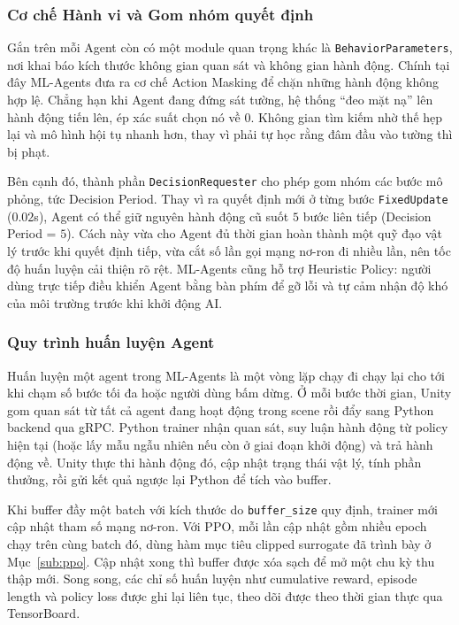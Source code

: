 \subsubsection{Cơ chế Hành vi và Gom nhóm quyết định}
\indent Gắn trên mỗi Agent còn có một module quan trọng khác là \texttt{BehaviorParameters},
nơi khai báo kích thước không gian quan sát và không gian hành động. Chính tại đây
ML-Agents đưa ra cơ chế Action Masking để chặn những hành động không
hợp lệ. Chẳng hạn khi Agent đang đứng sát tường, hệ thống ``đeo mặt nạ'' lên hành động tiến
lên, ép xác suất chọn nó về $0$. Không gian tìm kiếm nhờ thế hẹp lại và mô hình hội tụ nhanh
hơn, thay vì phải tự học rằng đâm đầu vào tường thì bị phạt.

\indent Bên cạnh đó, thành phần \texttt{DecisionRequester} cho phép gom nhóm các bước mô
phỏng, tức Decision Period. Thay vì ra quyết định mới ở từng bước \texttt{FixedUpdate}
($0.02$s), Agent có thể giữ nguyên hành động cũ suốt $5$ bước liên tiếp (Decision Period =
$5$). Cách này vừa cho Agent đủ thời gian hoàn thành một quỹ đạo vật lý trước khi quyết
định tiếp, vừa cắt số lần gọi mạng nơ-ron đi nhiều lần, nên tốc độ huấn luyện cải thiện
rõ rệt. ML-Agents cũng hỗ trợ Heuristic Policy: người dùng trực tiếp điều khiển Agent bằng
bàn phím để gỡ lỗi và tự cảm nhận độ khó của môi trường trước khi khởi động AI.

\subsubsection{Quy trình huấn luyện Agent}
\indent Huấn luyện một agent trong ML-Agents là một vòng lặp chạy đi chạy lại cho tới khi
chạm số bước tối đa hoặc người dùng bấm dừng. Ở mỗi bước thời gian, Unity gom quan sát từ
tất cả agent đang hoạt động trong scene rồi đẩy sang Python backend qua gRPC. Python
trainer nhận quan sát, suy luận hành động từ policy hiện tại (hoặc lấy mẫu ngẫu nhiên nếu
còn ở giai đoạn khởi động) và trả hành động về. Unity thực thi hành động đó, cập nhật
trạng thái vật lý, tính phần thưởng, rồi gửi kết quả ngược lại Python để tích vào buffer.

\indent Khi buffer đầy một batch với kích thước do \texttt{buffer\_size} quy định, trainer
mới cập nhật tham số mạng nơ-ron. Với PPO, mỗi lần cập nhật gồm nhiều epoch chạy trên cùng
batch đó, dùng hàm mục tiêu clipped surrogate đã trình bày ở Mục~\ref{sub:ppo}. Cập nhật
xong thì buffer được xóa sạch để mở một chu kỳ thu thập mới. Song song, các chỉ số huấn
luyện như cumulative reward, episode length và policy loss được ghi lại liên tục, theo dõi
được theo thời gian thực qua TensorBoard.

